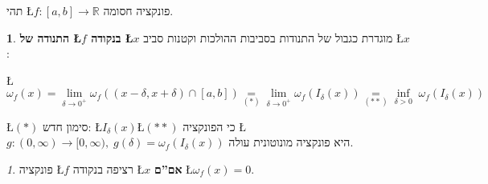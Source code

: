 \documentclass[english,hebrew]{article}
\theoremstyle{remark}
\theoremstyle{definition}
\newtheorem*{defn*}{\protect\definitionname}
\theoremstyle{plain}
\theoremstyle{remark}
\newtheorem{claim}[thm]{\protect\claimname}
\theoremstyle{plain}
\theoremstyle{plain}
\theoremstyle{definition}
\theoremstyle{plain}
\providecommand{\claimname}{טענה}
\providecommand{\definitionname}{הגדרה}
\begin{document}
תהי \L{$f:\left[a,b\right]\rightarrow\mathbb{R}$} פונקציה חסומה.
\begin{defn*}
\textbf{התנודה של \L{$f$} בנקודה \L{$x$}} מוגדרת כגבול של התנודות
בסביבות ההולכות וקטנות סביב \L{$x$}:

\L{%
\[
\omega_{f}(x)=\lim_{\delta\to0^{+}}\omega_{f}((x-\delta,x+\delta)\cap[a,b])\underset{(*)}{=}\lim_{\delta\to0^{+}}\omega_{f}(I_{\delta}(x))\underset{(**)}{=}\underset{\delta>0}{\inf}\;\omega_{f}\left(I_{\delta}(x)\right)
\]
}%

\L{$(*)$} סימון חדש: \L{$I_{\delta}(x)$}\qquad{}\L{$(**)$} כי
הפונקציה \L{$g:(0,\infty)\rightarrow[0,\infty),\;g(\delta)=\omega_{f}\left(I_{\delta}(x)\right)$}
היא פונקציה מונוטונית עולה.
\end{defn*}
\begin{claim}
פונקציה \L{$f$} רציפה בנקודה \L{$x$} \textbf{אם\textquotedblright ם}
\L{$\omega_{f}(x)=0$}.
\end{claim}
\end{document}
